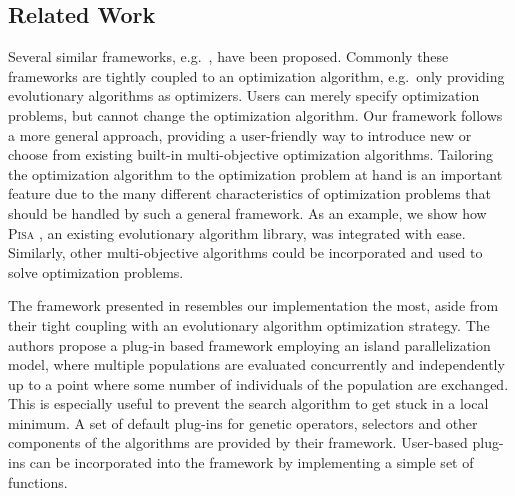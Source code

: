 \documentclass[%
reprint,
amsmath,amssymb,
aps,
prstab,
]{revtex4-1}
\begin{document}
\subsection{Related Work}

Several similar frameworks, e.g.~\cite{fide:09,lems:09,lbjt:07,dnld:06}, have
  been proposed.
Commonly these frameworks are tightly coupled to an optimization algorithm,
  e.g.\ only providing evolutionary algorithms as optimizers.
Users can merely specify optimization problems, but cannot change the
  optimization algorithm.
Our framework follows a more general approach, providing a user-friendly way
  to introduce new or choose from existing built-in multi-objective
  optimization algorithms.
Tailoring the optimization algorithm to the optimization problem at hand is
  an important feature due to the many different characteristics of
  optimization problems that should be handled by such a general framework.
As an example, we show how \textsc{Pisa} \cite{pisa}, an existing evolutionary
  algorithm library, was integrated with ease.
Similarly, other multi-objective algorithms could be incorporated and
  used to solve optimization problems.

The framework presented in \cite{lems:09} resembles our implementation the
  most, aside from their tight coupling with an evolutionary algorithm
  optimization strategy.
The authors propose a plug-in based framework employing an island
  parallelization model, where multiple populations are evaluated concurrently
  and independently up to a point where some number of individuals of the
  population are exchanged.
This is especially useful to prevent the search algorithm to get stuck in
  a local minimum.
A set of default plug-ins for genetic operators, selectors and other
  components of the algorithms are provided by their framework.
User-based plug-ins can be incorporated into the framework by implementing a
  simple set of functions.

\end{document}
